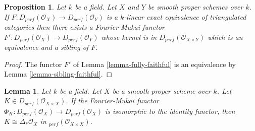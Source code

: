 \documentclass{stacks-project}
\theoremstyle{plain}
\newtheorem{proposition}[subsection]{Proposition}
\newtheorem{lemma}[subsection]{Lemma}
\theoremstyle{definition}
\theoremstyle{remark}
\numberwithin{equation}{subsection}
\begin{document}
\begin{proposition}
\label{proposition-equivalence}
Let $k$ be a field. Let $X$ and $Y$ be smooth proper schemes over $k$.
If $F : D_{perf}(\mathcal{O}_X) \to D_{perf}(\mathcal{O}_Y)$
is a $k$-linear exact equivalence of triangulated categories then
there exists a Fourier-Mukai functor
$F' : D_{perf}(\mathcal{O}_X) \to D_{perf}(\mathcal{O}_Y)$ whose
kernel is in $D_{perf}(\mathcal{O}_{X \times Y})$
which is an equivalence and a sibling of $F$.
\end{proposition}

\begin{proof}
The functor $F'$ of Lemma \ref{lemma-fully-faithful}
is an equivalence by Lemma \ref{lemma-sibling-faithful}.
\end{proof}

\begin{lemma}
\label{lemma-uniqueness}
Let $k$ be a field. Let $X$ be a smooth proper scheme over $k$.
Let $K \in D_{perf}(\mathcal{O}_{X \times X})$. If the Fourier-Mukai
functor $\Phi_K : D_{perf}(\mathcal{O}_X) \to D_{perf}(\mathcal{O}_X)$
is isomorphic to the identity functor, then
$K \cong \Delta_*\mathcal{O}_X$ in $_{perf}(\mathcal{O}_{X \times X})$.
\end{lemma}
\end{document}
